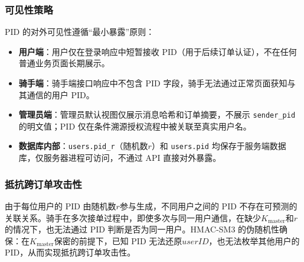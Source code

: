 \subsubsection*{可见性策略}

PID 的对外可见性遵循“最小暴露”原则：

\begin{itemize}[leftmargin=2em]
  \item \textbf{用户端}：用户仅在登录响应中短暂接收 PID（用于后续订单认证），不在任何普通业务页面长期展示。
  \item \textbf{骑手端}：骑手端接口响应中不包含 PID 字段，骑手无法通过正常页面获知与其通信的用户 PID。
  \item \textbf{管理员端}：管理员默认视图仅展示消息哈希和订单摘要，不展示 \texttt{sender\_pid} 的明文值；PID 仅在条件溯源授权流程中被关联至真实用户名。
  \item \textbf{数据库内部}：\texttt{users.pid\_r}（随机数$r$）和 \texttt{users.pid} 均保存于服务端数据库，仅服务器进程可访问，不通过 API 直接对外暴露。
\end{itemize}

\subsubsection*{抵抗跨订单攻击性}

由于每位用户的 PID 由随机数$r$参与生成，不同用户之间的 PID 不存在可预测的关联关系。骑手在多次接单过程中，即使多次与同一用户通信，在缺少$K_{\mathrm{master}}$和$r$的情况下，也无法通过 PID 判断是否为同一用户。HMAC-SM3 的伪随机性确保：在$K_{\mathrm{master}}$保密的前提下，已知 PID 无法还原$\mathit{userID}$，也无法枚举其他用户的 PID，从而实现抵抗跨订单攻击性。
